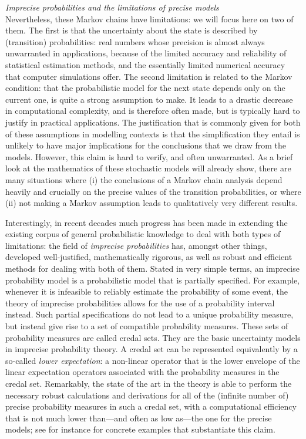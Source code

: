 \documentclass[11pt,dvipsnames,usenames,a4paper]{article}
\begin{document}
\emph{Imprecise probabilities and the limitations of precise models}\\[5pt]
Nevertheless, these Markov chains have limitations: we will focus here on two of them.
The first is that the uncertainty about the state is described by (transition) probabilities: real numbers whose precision is almost always unwarranted in applications, because of the limited accuracy and reliability of statistical estimation methods, and the essentially limited numerical accuracy that computer simulations offer.
The second limitation is related to the Markov condition: that the probabilistic model for the next state depends only on the current one, is quite a strong assumption to make. 
It leads to a drastic decrease in computational complexity, and is therefore often made, but is typically hard to justify in practical applications.
The justification that is commonly given for both of these assumptions in modelling contexts is that the simplification they entail is unlikely to have major implications for the conclusions that we draw from the models.
However, this claim is hard to verify, and often unwarranted.
As a brief look at the mathematics of these stochastic models will already show, there are many situations where (i) the conclusions of a Markov chain analysis depend heavily and crucially on the precise values of the transition probabilities, or where (ii) not making a Markov assumption leads to qualitatively very different results.

Interestingly, in recent decades much progress has been made in extending the existing corpus of general probabilistic knowledge to deal with both types of limitations: the field of \emph{imprecise probabilities} \cite{walley1991,augustin2013:itip,troffaes2013:lp} has, amongst other things, developed well-justified, mathematically rigorous, as well as robust and efficient methods for dealing with both of them.
Stated in very simple terms, an imprecise probability model is a probabilistic model that is partially specified.
For example, whenever it is infeasible to reliably estimate the probability of some event, the theory of imprecise probabilities allows for the use of a probability interval instead.
Such partial specifications do not lead to a unique probability measure, but instead give rise to a set of compatible probability measures.
These sets of probability measures are called credal sets.
They are the basic uncertainty models in imprecise probability theory. 
A credal set can be represented equivalently by a so-called \emph{lower expectation}: a non-linear operator that is the lower envelope of the linear expectation operators associated with the probability measures in the credal set.
Remarkably, the state of the art in the theory is able to perform the necessary robust calculations and derivations for all of the (infinite number of) precise probability measures in such a credal set, with a computational efficiency that is not much lower than---and often as low as---the one for the precise models; see for instance \cite{cooman2009,debock2014:estihmm,debock2015:thesis,cooman2008} for concrete examples that substantiate this claim.
\end{document}
